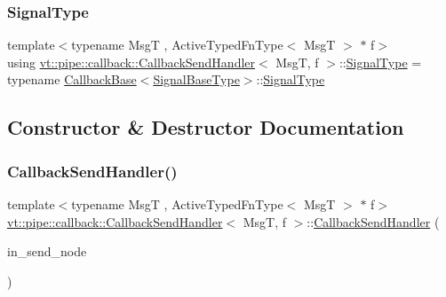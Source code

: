 \subsubsection{\texorpdfstring{Signal\+Type}{SignalType}}
{\footnotesize\ttfamily template$<$typename MsgT , Active\+Typed\+Fn\+Type$<$ Msg\+T $>$ $\ast$ f$>$ \\
using \hyperlink{structvt_1_1pipe_1_1callback_1_1_callback_send_handler}{vt\+::pipe\+::callback\+::\+Callback\+Send\+Handler}$<$ MsgT, f $>$\+::\hyperlink{structvt_1_1pipe_1_1callback_1_1_callback_send_handler_a1d3583e27e8cb606b31de9c3a9daa25b}{Signal\+Type} =  typename \hyperlink{structvt_1_1pipe_1_1callback_1_1_callback_base}{Callback\+Base}$<$\hyperlink{structvt_1_1pipe_1_1callback_1_1_callback_send_handler_af46916844a27c29e7c6134f962d0964f}{Signal\+Base\+Type}$>$\+::\hyperlink{structvt_1_1pipe_1_1callback_1_1_callback_send_handler_a1d3583e27e8cb606b31de9c3a9daa25b}{Signal\+Type}}



\subsection{Constructor \& Destructor Documentation}
\mbox{\label{structvt_1_1pipe_1_1callback_1_1_callback_send_handler_af1f6a9e98ca21793a1c6d0505bf65ed9}} 
\subsubsection{\texorpdfstring{Callback\+Send\+Handler()}{CallbackSendHandler()}}
{\footnotesize\ttfamily template$<$typename MsgT , Active\+Typed\+Fn\+Type$<$ Msg\+T $>$ $\ast$ f$>$ \\
\hyperlink{structvt_1_1pipe_1_1callback_1_1_callback_send_handler}{vt\+::pipe\+::callback\+::\+Callback\+Send\+Handler}$<$ MsgT, f $>$\+::\hyperlink{structvt_1_1pipe_1_1callback_1_1_callback_send_handler}{Callback\+Send\+Handler} (\begin{DoxyParamCaption}\item[{\hyperlink{namespacevt_a866da9d0efc19c0a1ce79e9e492f47e2}{Node\+Type} const \&}]{in\+\_\+send\+\_\+node }\end{DoxyParamCaption})}



